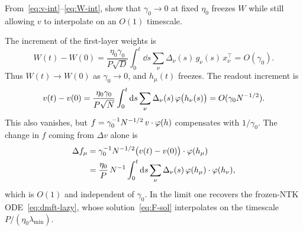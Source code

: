 \begin{exercise}
From~\eqref{eq:v-int}--\eqref{eq:W-int}, show that $\gamma_0\to 0$ at fixed $\eta_0$ freezes $W$ while still allowing $v$ to interpolate on an $O(1)$ timescale.
\end{exercise}
\begin{solution}
The increment of the first-layer weights is
\[
  W(t)-W(0)
  =\frac{\eta_0\gamma_0}{P\sqrt{D}}\int_0^t\dd s\sum_{\nu}\Delta_\nu(s)\,g_\nu(s)\,x_\nu^\top
  =O(\gamma_0).
\]
Thus $W(t)\to W(0)$ as $\gamma_0\to 0$, and $h_\mu(t)$ freezes. The readout increment is
\[
  v(t)-v(0)
  =\frac{\eta_0\gamma_0}{P\sqrt{N}}\int_0^t\mathrm{d} s\sum_{\nu}\Delta_\nu(s)\,\varphi\bigl(h_\nu(s)\bigr)
  =O(\gamma_0 N^{-1/2}).
\]
This also vanishes, but $f=\gamma_0^{-1}N^{-1/2}\,v\cdot\varphi(h)$ compensates with $1/\gamma_0$. The change in $f$ coming from $\Delta v$ alone is
\begin{align*}
  \Delta f_\mu
  &=\gamma_0^{-1}N^{-1/2}\bigl(v(t)-v(0)\bigr)\cdot\varphi(h_\mu)\\
  &=\frac{\eta_0}{P}\,N^{-1}\int_0^t\mathrm{d} s\sum_{\nu}\Delta_\nu(s)\,\varphi(h_\mu)\cdot\varphi(h_\nu),
\end{align*}
which is $O(1)$ and independent of $\gamma_0$. In the limit one recovers the frozen-NTK ODE~\eqref{eq:dmft-lazy}, whose solution~\eqref{eq:F-sol} interpolates on the timescale $P/(\eta_0\lambda_{\min})$.
\end{solution}
